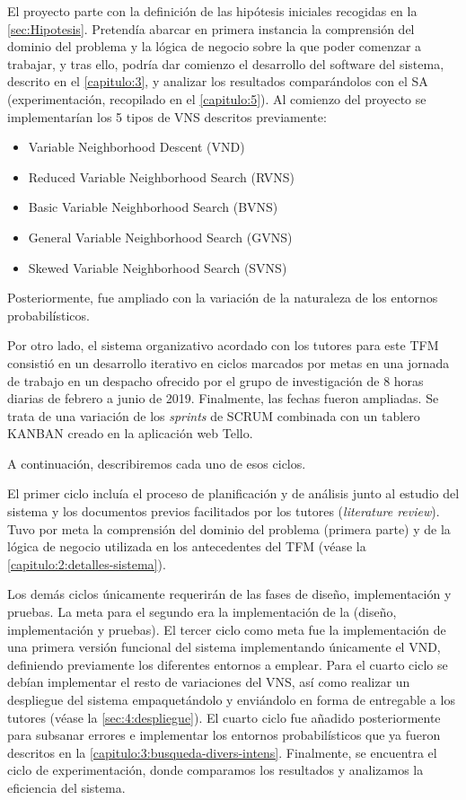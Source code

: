 El proyecto parte con la definición de las hipótesis iniciales recogidas en la \autoref{sec:Hipotesis}. 
Pretendía abarcar en primera instancia la comprensión del dominio del problema y la lógica de negocio sobre la que poder comenzar a trabajar, y tras ello, podría dar comienzo el desarrollo del software del sistema, descrito en el \autoref{capitulo:3}, y analizar los resultados comparándolos con el SA (experimentación, recopilado en el \autoref{capitulo:5}). Al comienzo del proyecto se implementarían los 5 tipos de VNS descritos previamente:
\begin{itemize}
	\item Variable Neighborhood Descent (VND)
	\item Reduced Variable Neighborhood Search (RVNS)
	\item Basic Variable Neighborhood Search (BVNS)
	\item General Variable Neighborhood Search (GVNS)
	\item Skewed Variable Neighborhood Search (SVNS)
\end{itemize}

Posteriormente, fue ampliado con la variación de la naturaleza de los entornos probabilísticos.

Por otro lado, el sistema organizativo acordado con los tutores para este TFM consistió en un desarrollo iterativo en ciclos marcados por metas en una jornada de trabajo en un despacho ofrecido por el grupo de investigación de 8 horas diarias de febrero a junio de 2019. Finalmente, las fechas fueron ampliadas. Se trata de una variación de los \textit{sprints} de SCRUM combinada con un tablero KANBAN creado en la aplicación web Tello. 

A continuación, describiremos cada uno de esos ciclos.

El primer ciclo incluía el proceso de planificación y de análisis junto al estudio del sistema y los documentos previos facilitados por los tutores (\textit{literature review}). Tuvo por meta la comprensión del dominio del problema (primera parte) y de la lógica de negocio utilizada en los antecedentes del TFM (véase la \autoref{capitulo:2:detalles-sistema}).

Los demás ciclos únicamente requerirán de las fases de diseño, implementación y pruebas. La meta para el segundo era la implementación de la \faseuno{} (diseño, implementación y pruebas). El tercer ciclo como meta fue la implementación de una primera versión funcional del sistema implementando únicamente el VND, definiendo previamente los diferentes entornos a emplear. Para el cuarto ciclo se debían implementar el resto de variaciones del VNS, así como realizar un despliegue del sistema empaquetándolo y enviándolo en forma de entregable a los tutores (véase la \autoref{sec:4:despliegue}). El cuarto ciclo fue añadido posteriormente para subsanar errores e implementar los entornos probabilísticos que ya fueron descritos en la \autoref{capitulo:3:busqueda-divers-intens}. Finalmente, se encuentra el ciclo de experimentación, donde comparamos los resultados y analizamos la eficiencia del sistema.

